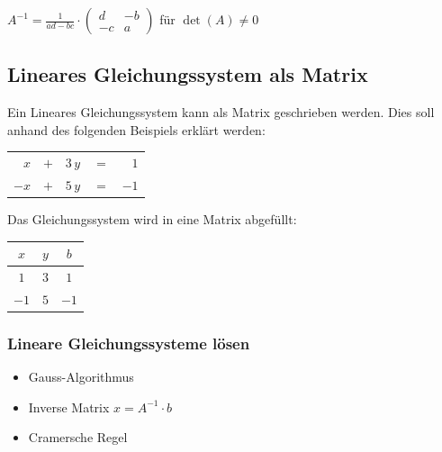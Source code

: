 
$A^{-1} = \frac{1}{ad-bc} \cdot 
	\begin{pmatrix}
		d  & -b \\
		-c & a 
	\end{pmatrix} $  für $\det(A) \neq 0$

\columnbreak


\subsection{Lineares Gleichungssystem als Matrix}

Ein Lineares Gleichungssystem kann als Matrix geschrieben werden. Dies soll anhand des folgenden Beispiels erklärt werden:
			

\begin{tabular}{rclcr}
	$x$		& $+$ 	& $3 \, y$ 	& $=$ 	& $1$	\\
	$-x$ 	& $+$ 	& $5 \, y$ 	& $=$ 	& $-1$  
\end{tabular} 

\vspace{0.2cm}

Das Gleichungssystem wird in eine Matrix abgefüllt:
\vspace{0.2cm}

\begin{tabular}[h]{|c c | c|}
	\hline
	$x$  & $y$ & $b$	\\
	\hline
	$1$  & $3$ & $1$ 	\\
	$-1$ & $5$ & $-1$ 	\\
	\hline
\end{tabular}
			
			
\subsubsection{Lineare Gleichungssysteme lösen}

\begin{itemize}
	\item Gauss-Algorithmus
	\item Inverse Matrix $x = A^{-1} \cdot b$
	\item Cramersche Regel
\end{itemize}
	

